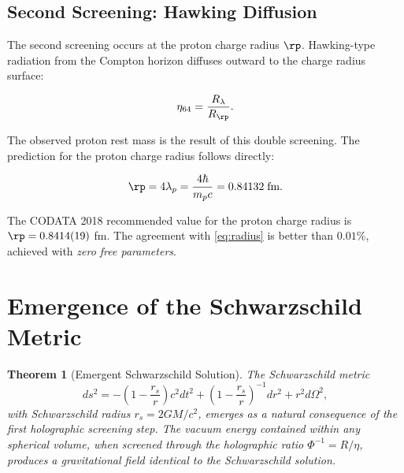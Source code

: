 \documentclass[12pt, a4paper]{article}
\theoremstyle{plain}
\newtheorem{theorem}{Theorem}[section]
\theoremstyle{definition}
\begin{document}
\subsection{Second Screening: Hawking Diffusion}

The second screening occurs at the proton charge radius $\rp$. Hawking-type
radiation from the Compton horizon diffuses outward to the charge radius
surface:

\begin{equation}
  \eta_{64} = \frac{R_\lambda}{R_{\rp}}.
\end{equation}

The observed proton rest mass is the result of this double screening.
The prediction for the proton charge radius follows directly:

\begin{equation}\label{eq:radius}
  \rp = 4\lambda_p = \frac{4\hbar}{m_p c} = 0.84132 \; \text{fm}.
\end{equation}

\begin{remark}
  The CODATA 2018 recommended value \citep{CODATA2018} for the proton charge
  radius is $\rp = 0.8414(19)$ fm. The agreement with \eqref{eq:radius}
  is better than $0.01\%$, achieved with \emph{zero free parameters}.
\end{remark}

\section{Emergence of the Schwarzschild Metric}\label{sec:schwarzschild}

\begin{theorem}[Emergent Schwarzschild Solution]\label{thm:schwarzschild}
  The Schwarzschild metric
  \begin{equation}
    ds^2 = -\left(1 - \frac{r_s}{r}\right)c^2 dt^2
    + \left(1 - \frac{r_s}{r}\right)^{-1} dr^2
    + r^2 d\Omega^2,
  \end{equation}
  with Schwarzschild radius $r_s = 2GM/c^2$, emerges as a natural consequence
  of the first holographic screening step. The vacuum energy contained within
  any spherical volume, when screened through the holographic ratio
  $\Phi^{-1} = R/\eta$, produces a gravitational field identical to the
  Schwarzschild solution.
\end{theorem}
\end{document}
